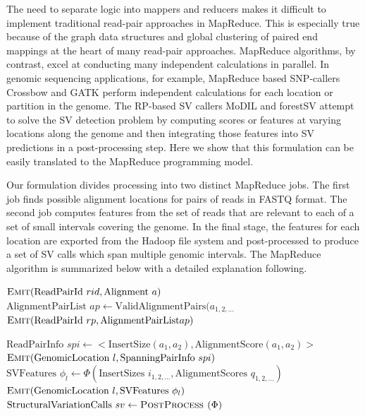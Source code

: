 \documentclass[11pt]{article}
\begin{document}
The need to separate logic into mappers and reducers makes it difficult to implement traditional read-pair approaches in MapReduce. This is especially true because of the graph data structures and global clustering of paired end mappings at the heart of many read-pair approaches. MapReduce algorithms, by contrast, excel at conducting many independent calculations in parallel. In genomic sequencing applications, for example, MapReduce based SNP-callers Crossbow \autocite{Langmead:2009p1225} and GATK \autocite{McKenna:2010p1051} perform independent calculations for each location or partition in the genome. The RP-based SV callers MoDIL \autocite{Lee:2009da} and forestSV \autocite{Michaelson:2012fj} attempt to solve the SV detection problem by computing scores or features at varying locations along the genome and then integrating those features into SV predictions in a post-processing step. Here we show that this formulation can be easily translated to the MapReduce programming model.

Our formulation divides processing into two distinct MapReduce jobs. The first job finds possible alignment locations for pairs of reads in FASTQ format. The second job computes features from the set of reads that are relevant to each of a set of small intervals covering the genome. In the final stage, the features for each location are exported from the Hadoop file system and post-processed to produce a set of SV calls which span multiple genomic intervals. The MapReduce algorithm is summarized below with a detailed explanation following.

\algrenewcommand{}
  \begin{algorithmic}[1]
    \State $\textsc{Emit}(\textrm{ReadPairId }rid, \textrm{Alignment }a)$
    \EndFor
    \EndFunction
    \State $\textrm{AlignmentPairList }ap \gets \textrm{ValidAlignmentPairs}(a_{1,2,\ldots}$
    \State $\textsc{Emit}(\textrm{ReadPairId }rp, \textrm{AlignmentPairList} ap)$
    \EndFunction
    \EndProcedure

    \State $ \textrm{ReadPairInfo }spi \gets <\textrm{InsertSize}(a_1,a_2), \textrm{AlignmentScore}(a_1,a_2)>$
    \State $\textsc{Emit}(\textrm{GenomicLocation }l, \textrm{SpanningPairInfo }spi)$
    \EndFor
    \EndFor
    \EndFunction
    \State $\textrm{SVFeatures } \phi_l \gets \Phi(\textrm{InsertSizes }i_{1,2,\ldots}, \textrm{AlignmentScores }q_{1,2,\ldots})$
    \State $\textsc{Emit}(\textrm{GenomicLocation }l, \textrm{SVFeatures } \phi_l)$
    \EndFunction
    \EndProcedure
    \State $\textrm{StructuralVariationCalls } sv \gets \textsc{PostProcess }(\Phi)$ 
  \end{algorithmic}
\end{document}
